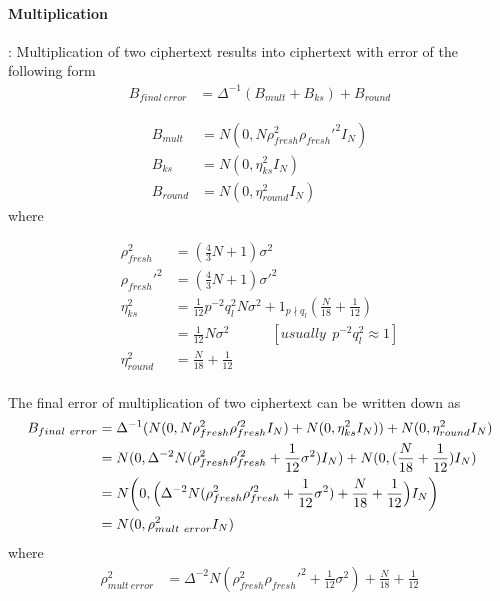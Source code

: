\documentclass[a4paper,10pt]{article}
\begin{document}
\paragraph{Multiplication}: Multiplication of two ciphertext results into ciphertext with error of the following form
\begin{align}
    B_{final\ error} &= \Delta^{-1}(B_{mult}+B_{ks})+B_{round}
\end{align}

\begin{align*}
B_{mult} &= N(0,N\rho_{fresh}^2\rho_{fresh}'^2I_N) \\
  B_{ks} &= N(0,\eta_{ks}^2I_N) \\
  B_{round} &= N(0,\eta_{round}^2 I_N)
\end{align*}
where

\begin{align*}
\rho_{fresh}^2 &=(\frac{4}{3}N+1)\sigma^2 \\
\rho_{fresh}'^2 &=(\frac{4}{3}N+1)\sigma'^2 \\
\eta_{ks}^2     &=\frac{1}{12}p^{-2}q^2_{l}N\sigma^2+1_{p \nmid q_l}(\frac{N}{18}+\frac{1}{12}) \\
                &=\frac{1}{12} N\sigma^2 \hspace{3em}[usually\ \ p^{-2}q^2_{l}\approx 1]\\
\eta^2_{round}  &= \frac{N}{18} + \frac{1}{12}\\
\end{align*}

The final error of multiplication of two ciphertext can be written down as
\begin{align}
    B_{final\ error} &= \Delta^{-1}(N(0,N\rho_{fresh}^2\rho_{fresh}'^2I_N)+ N(0,\eta_{ks}^2I_N))+N(0,\eta_{round}^2 I_N) \nonumber \\
                     &= N(0,\Delta^{-2}N(\rho_{fresh}^2\rho_{fresh}'^2+\frac{1}{12}\sigma^2)I_N) + N(0,(\frac{N}{18}+\frac{1}{12})I_N) \nonumber \\
                     &= N \biggl(0,\Bigl(\Delta^{-2}N(\rho_{fresh}^2\rho_{fresh}'^2+\frac{1}{12}\sigma^2)+\frac{N}{18}+\frac{1}{12}\Bigr)I_N\biggl) \nonumber \\
                     &=N(0,\rho_{mult\ error}^2I_N)
\end{align}
where
\begin{align*}
\rho_{mult\ error}^2 &= \Delta^{-2}N(\rho_{fresh}^2\rho_{fresh}'^2+\frac{1}{12}\sigma^2)+\frac{N}{18}+\frac{1}{12}  \\
\end{align*}
\end{document}
